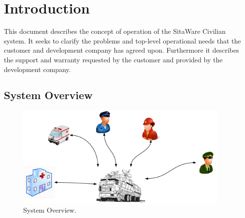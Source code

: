 \chapter{Introduction}
This document describes the concept of operation of the SitaWare Civilian system. It seeks to clarify the problems and top-level operational needs that the customer and development company has agreed upon. Furthermore it describes the support and warranty requested by the customer and provided by the development company. 

\section{System Overview}





\begin{figure}[H]
\centering
\includegraphics[width=0.95\textwidth]
{billeder/system_overview.pdf}
\caption{System Overview.}
\label{fig:system_overview}
\end{figure}